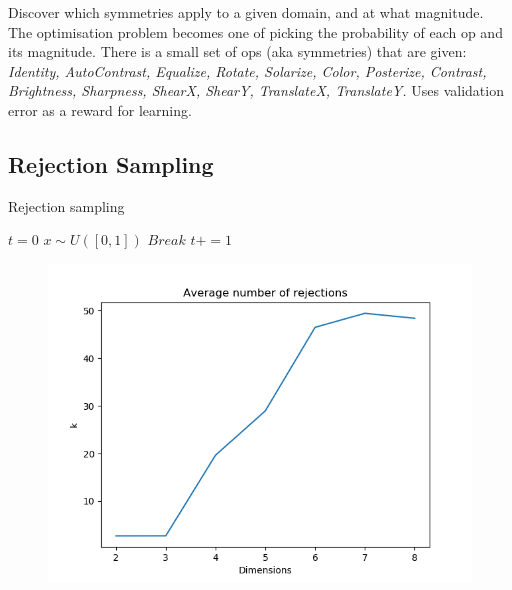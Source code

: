  \cite{Ho2019a, Lim2019, Cubuk2018, Cubuk2019}
 Discover which symmetries apply to a given domain, and at what magnitude.
 The optimisation problem becomes one of picking the probability of each op and its magnitude.
 There is a small set of ops (aka symmetries) that are given:
 \textit{Identity, AutoContrast, Equalize, Rotate, Solarize, Color, Posterize, Contrast,
 	Brightness, Sharpness, ShearX, ShearY, TranslateX, TranslateY.}
 Uses validation error as a reward for learning.


\subsection{Rejection Sampling}\label{rejection-sampling}

\begin{algorithm}
	\caption{Rejection sampling}
	\begin{algorithmic}[1]

		\State $t=0$
			\State $x\sim U([0, 1])$
				\State $Break$
			\EndIf
			\State $t += 1$
		\EndWhile
		\State {}
		\EndProcedure

	\end{algorithmic}
\end{algorithm}


\begin{figure}[h!]
\centering
\includegraphics[width=1\textwidth,height=0.5\textheight]{../../pictures/figures/ks.png}
\caption{}
\end{figure}


